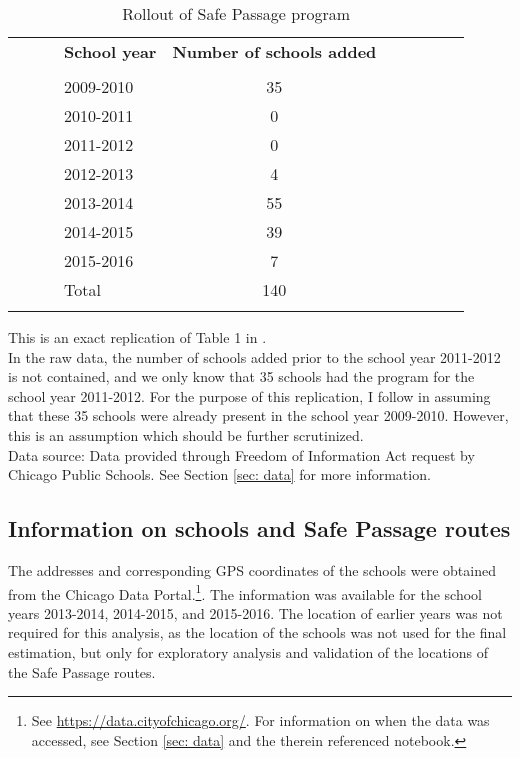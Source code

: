 \documentclass[]{article}
\begin{document}
\begin{table}[H] \centering
	\caption{Rollout of Safe Passage program}
	\label{tab:foia}
		\begin{threeparttable}
		\begin{tabular}{ccclcccccc}
			\cline{4-5} \\
			& & & \textbf{School year} & \textbf{Number of schools added} \\
			\cline{4-5} \\
			&& & 2009-2010 &  35 & &\\ \addlinespace
			&& & 2010-2011 & 0 && \\ \addlinespace
			&& &2011-2012 & 0 &\\ \addlinespace
			&& &2012-2013 & 4 &\\ \addlinespace
			&& &2013-2014 & 55 &\\ \addlinespace
			&& &2014-2015 & 39 &\\ \addlinespace
			&& &2015-2016 & 7 &\\ \addlinespace
			&& &Total & 140 &\\ \addlinespace
			\hline
		\end{tabular}
		\begin{tablenotes}
			This is an exact replication of Table 1 in \cite{mcmillen2017}.\\
			In the raw data, the number of schools added prior to the school year 2011-2012 is not contained, and we only know that 35 schools had the program for the school year 2011-2012. For the purpose of this replication, I follow \cite{mcmillen2017} in assuming that these 35 schools were already present in the school year 2009-2010. However, this is an assumption which should be further scrutinized. \\
			Data source: Data provided through Freedom of Information Act request by Chicago Public Schools. See Section \ref{sec: data} for more information.
		\end{tablenotes}
	\end{threeparttable}
\end{table}



\subsection{Information on schools and Safe Passage routes}
The addresses and corresponding GPS coordinates of the schools were obtained from the Chicago Data Portal.\footnote{See \url{https://data.cityofchicago.org/}. For information on when the data was accessed, see Section \ref{sec: data} and the therein referenced notebook.}. The information was available for the school years 2013-2014, 2014-2015, and 2015-2016. The location of earlier years was not required for this analysis, as the location of the schools was not used for the final estimation, but only for exploratory analysis and validation of the locations of the Safe Passage routes.  \\
\end{document}
